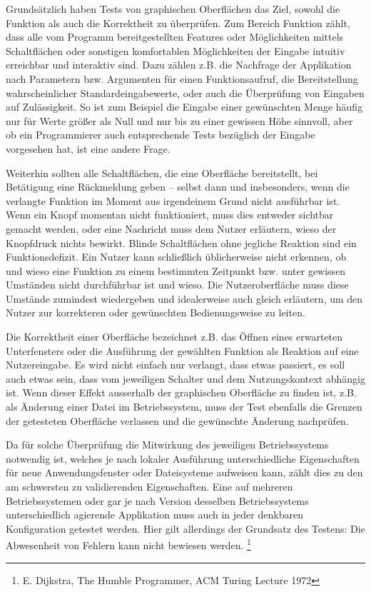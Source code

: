 Grundsätzlich haben Tests von graphischen Oberflächen das Ziel, sowohl die
Funktion als auch die Korrektheit zu überprüfen. Zum Bereich Funktion zählt,
dass alle vom Programm bereitgestellten Features oder Möglichkeiten mittels
Schaltflächen oder sonstigen komfortablen Möglichkeiten der Eingabe
intuitiv erreichbar und interaktiv sind. Dazu zählen z.B. die Nachfrage
der Applikation nach Parametern bzw. Argumenten für einen Funktionsaufruf,
die Bereitstellung wahrscheinlicher Standardeingabewerte, oder auch die
Überprüfung von Eingaben auf Zulässigkeit. So ist zum Beispiel die
Eingabe einer gewünschten Menge häufig nur für Werte größer als Null
und nur bis zu einer gewissen Höhe sinnvoll, aber ob ein Programmierer
auch entsprechende Tests bezüglich der Eingabe vorgesehen hat, ist
eine andere Frage.

Weiterhin sollten alle Schaltflächen, die eine Oberfläche bereitstellt,
bei Betätigung eine Rückmeldung geben -- selbst dann und insbesonders, wenn die verlangte
Funktion im Moment aus irgendeinem Grund nicht ausführbar ist.
Wenn ein Knopf momentan nicht funktioniert, muss dies entweder sichtbar gemacht werden,
oder eine Nachricht muss dem Nutzer erläutern, wieso der Knopfdruck nichts bewirkt.
\glqq{}Blinde\grqq{} Schaltflächen ohne jegliche Reaktion sind ein Funktionsdefizit.
Ein Nutzer kann schließlich üblicherweise nicht erkennen, ob und wieso eine Funktion
zu einem bestimmten Zeitpunkt bzw. unter gewissen Umständen nicht durchführbar ist
und wieso. Die Nutzeroberfläche muss diese Umstände zumindest wiedergeben
und idealerweise auch gleich erläutern, um den Nutzer zur korrekteren oder gewünschten
Bedienungsweise zu leiten.

Die Korrektheit einer Oberfläche bezeichnet z.B. das Öffnen eines erwarteten
Unterfensters oder die Ausführung der gewählten Funktion als Reaktion auf eine
Nutzereingabe. Es wird nicht einfach nur verlangt, dass etwas passiert, es soll
auch etwas sein, dass vom jeweiligen Schalter und dem Nutzungskontext abhängig ist.
Wenn dieser Effekt ausserhalb der graphischen Oberfläche zu finden ist, z.B.
als Änderung einer Datei im Betriebssystem, muss der Test ebenfalls die Grenzen
der getesteten Oberfläche verlassen und die gewünschte Änderung nachprüfen.

Da für solche Überprüfung die Mitwirkung des jeweiligen Betriebssystems notwendig
ist, welches je nach lokaler Ausführung unterschiedliche Eigenschaften für neue
Anwendungsfenster oder Dateisysteme aufweisen kann, zählt dies zu den am schwersten
zu validierenden Eigenschaften. Eine auf mehreren Betriebssystemen oder gar je
nach Version desselben Betriebssystems unterschiedlich agierende Applikation muss auch
in jeder denkbaren Konfiguration getestet werden. Hier gilt allerdings der
Grundsatz des Testens: \glqq{}Die Abwesenheit von Fehlern kann nicht bewiesen werden.\grqq{}
\footnote{E. Dijkstra, The Humble Programmer, ACM Turing Lecture 1972}

